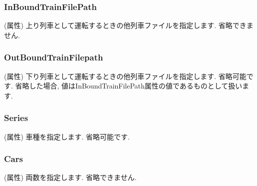 \documentclass[paper={550pt,2910pt},lualatex , ja=standard]{bxjsreport}
\begin{document}
\subsubsection*{InBoundTrainFilePath}
(属性) 上り列車として運転するときの他列車ファイルを指定します. 省略できません.
\subsubsection*{OutBoundTrainFilepath}
(属性) 下り列車として運転するときの他列車ファイルを指定します. 省略可能です. 省略した場合, 値はInBoundTrainFilePath属性の値であるものとして扱います.
\subsubsection*{Series}
(属性) 車種を指定します. 省略可能です.
\subsubsection*{Cars}
(属性) 両数を指定します. 省略できません.
\end{document}
